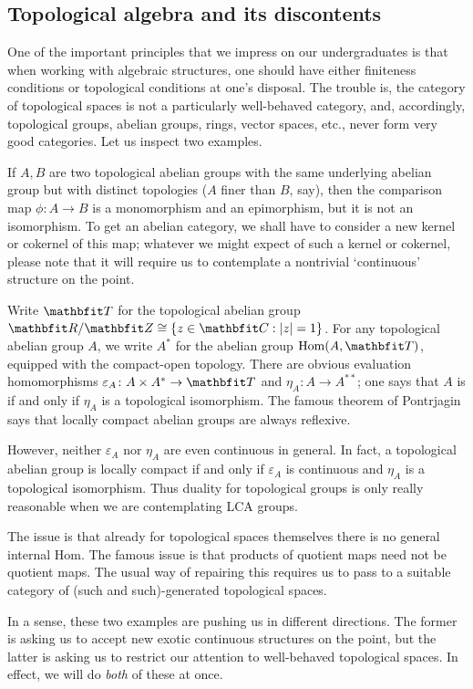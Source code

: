 \subsection*{Topological algebra and its discontents}

One of the important principles that we impress on our undergraduates is that when working with algebraic structures, one should have either finiteness conditions or topological conditions at one's disposal.
The trouble is, the category of topological spaces is not a particularly well-behaved category, and, accordingly, topological groups, abelian groups, rings, vector spaces, etc., never form very good categories.
Let us inspect two examples.

\begin{exm*}
	If $ A, B $ are two topological abelian groups with the same underlying abelian group but with distinct topologies ($ A $ finer than $ B $, say), then the comparison map $ \phi \colon A \to B $ is a monomorphism and an epimorphism, but it is not an isomorphism.
	To get an abelian category, we shall have to consider a new kernel or cokernel of this map;
	whatever we might expect of such a kernel or cokernel, please note that it will require us to contemplate a nontrivial `continuous' structure on the point.
\end{exm*}

\begin{exm*}
	Write $ \TT $ for the topological abelian group $ \RR/\ZZ \cong \{ z \in \CC : |z| = 1 \} $.
	For any topological abelian group $ A $, we write $ A^{\ast} $ for the  abelian group $ \Hom(A, \TT) $, equipped with the compact-open topology.
	There are obvious evaluation homomorphisms $ \varepsilon_A \colon A \times A^{\ast} \to \TT $ and $ \eta_A \colon A \to A^{\ast\ast} $;
	one says that $ A $ is  if and only if $ \eta_A $ is a topological isomorphism.
	The famous theorem of Pontrjagin says that locally compact abelian groups are always reflexive.

	However, neither $ \varepsilon_A $ nor $ \eta_A $ are even continuous in general.
	In fact, a topological abelian group is locally compact if and only if $ \varepsilon_A $ is continuous and $ \eta_A $ is a topological isomorphism.
	Thus duality for topological groups is only really reasonable when we are contemplating LCA groups.

	The issue is that already for topological spaces themselves there is no general internal Hom.
	The famous issue is that products of quotient maps need not be quotient maps.
	The usual way of repairing this requires us to pass to a suitable category of (such and such)-generated topological spaces.
\end{exm*}

In a sense, these two examples are pushing us in different directions.
The former is asking us to accept new exotic continuous structures on the point, but the latter is asking us to restrict our attention to well-behaved topological spaces.
In effect, we will do \emph{both} of these at once.


